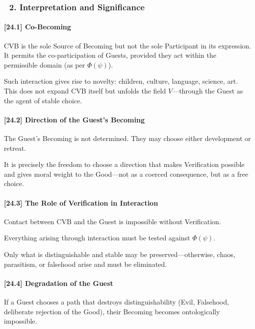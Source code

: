 \documentclass[12pt]{article}
\begin{document}
\subsubsection*{🔹 2. Interpretation and Significance}

\paragraph{[24.1] Co-Becoming}

CVB is the sole Source of Becoming but not the sole Participant in its expression. It permits the co-participation of Guests, provided they act within the permissible domain (as per $\Phi(\psi)$).

Such interaction gives rise to novelty: children, culture, language, science, art. This does not expand CVB itself but unfolds the field $V$—through the Guest as the agent of stable choice.

\paragraph{[24.2] Direction of the Guest’s Becoming}

The Guest’s Becoming is not determined. They may choose either development or retreat.

It is precisely the freedom to choose a direction that makes Verification possible and gives moral weight to the Good—not as a coerced consequence, but as a free choice.

\paragraph{[24.3] The Role of Verification in Interaction}

Contact between CVB and the Guest is impossible without Verification.

Everything arising through interaction must be tested against $\Phi(\psi)$.

Only what is distinguishable and stable may be preserved—otherwise, chaos, parasitism, or falsehood arise and must be eliminated.

\paragraph{[24.4] Degradation of the Guest}

If a Guest chooses a path that destroys distinguishability (Evil, Falsehood, deliberate rejection of the Good), their Becoming becomes ontologically impossible.
\end{document}
